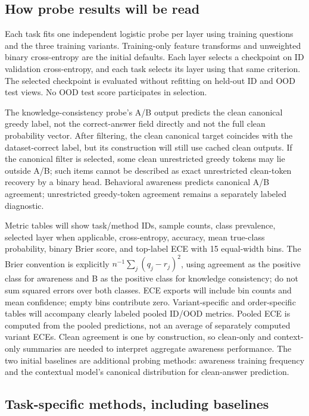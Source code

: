 \documentclass[11pt]{article}
\begin{document}
\subsection*{How probe results will be read}

Each task fits one independent logistic probe per layer using training questions and the three training variants.
Training-only feature transforms and unweighted binary cross-entropy are the initial defaults.
Each layer selects a checkpoint on ID validation cross-entropy, and each task selects its layer using that same criterion.
The selected checkpoint is evaluated without refitting on held-out ID and OOD test views.
No OOD test score participates in selection.

The knowledge-consistency probe's A/B output predicts the clean canonical greedy label, not the correct-answer field directly and not the full clean probability vector.
After filtering, the clean canonical target coincides with the dataset-correct label, but its construction will still use cached clean outputs.
If the canonical filter is selected, some clean unrestricted greedy tokens may lie outside A/B; such items cannot be described as exact unrestricted clean-token recovery by a binary head.
Behavioral awareness predicts canonical A/B agreement; unrestricted greedy-token agreement remains a separately labeled diagnostic.

Metric tables will show task/method IDs, sample counts, class prevalence, selected layer when applicable, cross-entropy, accuracy, mean true-class probability, binary Brier score, and top-label ECE with 15 equal-width bins.
The Brier convention is explicitly $n^{-1}\sum_j(q_j-r_j)^2$, using agreement as the positive class for awareness and B as the positive class for knowledge consistency; do not sum squared errors over both classes.
ECE exports will include bin counts and mean confidence; empty bins contribute zero.
Variant-specific and order-specific tables will accompany clearly labeled pooled ID/OOD metrics.
Pooled ECE is computed from the pooled predictions, not an average of separately computed variant ECEs.
Clean agreement is one by construction, so clean-only and context-only summaries are needed to interpret aggregate awareness performance.
The two initial baselines are additional probing methods: awareness training frequency and the contextual model's canonical distribution for clean-answer prediction.

\subsection*{Task-specific methods, including baselines}
\end{document}
